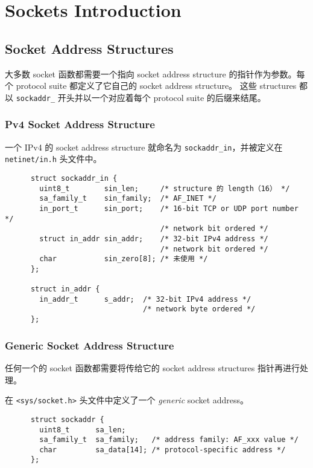 \section{Sockets Introduction}

  \subsection{Socket Address Structures}

    大多数 socket 函数都需要一个指向 socket address structure 的指针作为参数。每个 protocol suite 都定义了它自己的 socket address structure。
    这些 structures 都以 \texttt{sockaddr\_} 开头并以一个对应着每个 protocol suite 的后缀来结尾。

    \subsubsection{Pv4 Socket Address Structure}

      一个 IPv4 的 socket address structure 就命名为 \texttt{sockaddr\_in}，并被定义在 \texttt{netinet/in.h} 头文件中。

      \begin{verbatim}
      struct sockaddr_in {
        uint8_t        sin_len;     /* structure 的 length（16） */
        sa_family_t    sin_family;  /* AF_INET */
        in_port_t      sin_port;    /* 16-bit TCP or UDP port number */
                                    /* network bit ordered */
        struct in_addr sin_addr;    /* 32-bit IPv4 address */
                                    /* network bit ordered */
        char           sin_zero[8]; /* 未使用 */
      };

      struct in_addr {
        in_addr_t      s_addr;  /* 32-bit IPv4 address */
                                /* network byte ordered */
      };
      \end{verbatim}

    \subsubsection{Generic Socket Address Structure}

      任何一个的 socket 函数都需要将传给它的 socket address structures 指针再进行处理。

      在 \texttt{<sys/socket.h>} 头文件中定义了一个 \textit{generic} socket address。

      \begin{verbatim}
      struct sockaddr {
        uint8_t      sa_len;
        sa_family_t  sa_family;   /* address family: AF_xxx value */
        char         sa_data[14]; /* protocol-specific address */
      };
      \end{verbatim}


